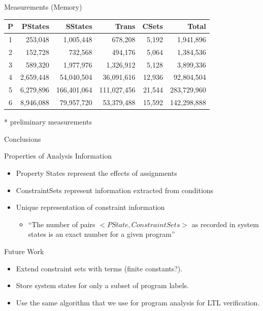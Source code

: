 \begin{frame}{Measurements (Memory)}
\begin{center}
\begin{tabular}{|c|r|r|r|r|r|}\hline
P& PStates & SStates &Trans &CSets& Total \\\hline\hline
1 &253,048 & 1,005,448 & 678,208 & 5,192 & 1,941,896\\\hline
2 &152,728 & 732,568 & 494,176 & 5,064 & 1,384,536\\\hline
3 &589,320 & 1,977,976 & 1,326,912 & 5,128 & 3,899,336\\\hline
4 &2,659,448 & 54,040,504 & 36,091,616 & 12,936 & 92,804,504\\\hline
5 &6,279,896 & 166,401,064 & 111,027,456 & 21,544 & 283,729,960\\\hline
6 &8,946,088 & 79,957,720 & 53,379,488 & 15,592 & 142,298,888\\\hline
\end{tabular}
\end{center}

\vspace{0.5cm}
* preliminary measurements

\end{frame}

\begin{frame}{Conclusions}

\begin{block}{Properties of Analysis Information}
\begin{itemize}
\item Property States represent the effects of assignments
\item ConstraintSets represent information extracted from conditions
\item Unique representation of constraint information 
\begin{itemize}
\item ``The number of pairs $<PState,ConstraintSets>$ as recorded in system states is an exact number for a given program''
\end{itemize}
\end{itemize}
\end{block}

\begin{block}{Future Work}
\begin{itemize}
\item Extend constraint sets with terms (finite constants?).
\item Store system states for only a subset of program labels.
\item Use the same algorithm that we use for program analysis for LTL verification.
\end{itemize}
\end{block}

\end{frame}




